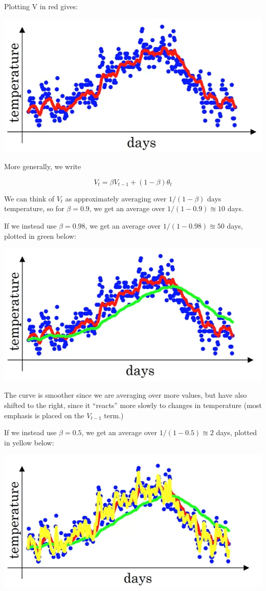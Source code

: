 Plotting V in red gives:

\includegraphics[width=0.7\linewidth]{images/temperatures_one_moving_avg.png}

More generally, we write

\[
    V_t = \beta V_{t-1} + (1 - \beta) \theta_t
\]

We can think of $V_t$  as approximately averaging over  $1/(1-\beta)$  days temperature, 
so for $\beta = 0.9$, we get an average over $1/(1 - 0.9) \approxeq 10$ days.

If we instead use $\beta = 0.98$, we get an average over $1/(1 - 0.98) \approxeq 50$ days, plotted in green below:

\includegraphics[width=0.7\linewidth]{images/temperatures_two_moving_avgs.png}

The curve is smoother since we are averaging over more values, but have also shifted to the right,
since it ``reacts'' more slowly to changes in temperature (most emphasis is placed on the $V_{t - 1}$ term.)

If we instead use $\beta = 0.5$, we get an average over $ 1 / (1 - 0.5) \approxeq 2$ days, plotted in yellow below:

\includegraphics[width=0.7\linewidth]{images/temperatures_three_moving_avgs.png}



